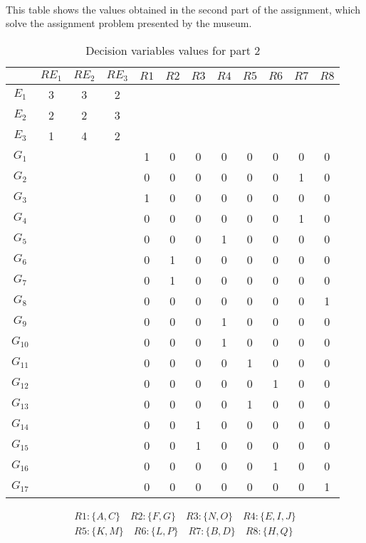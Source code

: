 \paragraph{}
This table shows the values obtained in the second part of the assignment, which solve the assignment problem presented by the museum.
\begin{table}[H]
    \setlength{\arrayrulewidth}{.1em}
    \centering
    \caption{Decision variables values for part 2}
    \begin{tabular}{cccc|cccccccc}
        \rowcolor{gray!60}
        \hline
        & $RE_1$ & $RE_2$ & $RE_3$ & $R1$ & $R2$ & $R3$ & $R4$ & $R5$ & $R6$ & $R7$ & $R8$\\
        \hline
        $E_1$ & 3 & 3 & 2\\
        $E_2$ & 2 & 2 & 3\\
        $E_3$ & 1 & 4 & 2 \\
        \hline
        $G_1$ & & & & 1 & 0 & 0 & 0 & 0 & 0 & 0 & 0\\
        $G_2$ & & & & 0 & 0 & 0 & 0 & 0 & 0 & 1 & 0\\
        $G_3$ & & & & 1 & 0 & 0 & 0 & 0 & 0 & 0 & 0\\
        $G_4$ & & & & 0 & 0 & 0 & 0 & 0 & 0 & 1 & 0\\
        $G_5$ & & & & 0 & 0 & 0 & 1 & 0 & 0 & 0 & 0\\
        $G_6$ & & & & 0 & 1 & 0 & 0 & 0 & 0 & 0 & 0\\
        $G_7$ & & & & 0 & 1 & 0 & 0 & 0 & 0 & 0 & 0\\
        $G_8$ & & & & 0 & 0 & 0 & 0 & 0 & 0 & 0 & 1\\
        $G_9$ & & & & 0 & 0 & 0 & 1 & 0 & 0 & 0 & 0\\
        $G_{10}$ & & & & 0 & 0 & 0 & 1 & 0 & 0 & 0 & 0\\
        $G_{11}$ & & & & 0 & 0 & 0 & 0 & 1 & 0 & 0 & 0\\
        $G_{12}$ & & & & 0 & 0 & 0 & 0 & 0 & 1 & 0 & 0\\
        $G_{13}$ & & & & 0 & 0 & 0 & 0 & 1 & 0 & 0 & 0\\
        $G_{14}$ & & & & 0 & 0 & 1 & 0 & 0 & 0 & 0 & 0\\
        $G_{15}$ & & & & 0 & 0 & 1 & 0 & 0 & 0 & 0 & 0\\
        $G_{16}$ & & & & 0 & 0 & 0 & 0 & 0 & 1 & 0 & 0\\
        $G_{17}$ & & & & 0 & 0 & 0 & 0 & 0 & 0 & 0 & 1\\
        \hline
    \end{tabular}
    \label{table: solution part 2 - decision variables}
\end{table}
\begin{align}
    R1: \{A,C\} \quad R2: \{F,G\} \quad R3: \{N,O\} \quad R4: \{E,I,J\}\nonumber\\
    R5: \{K,M\} \quad R6: \{L,P\} \quad R7: \{B,D\} \quad R8: \{H,Q\}\nonumber\\
    \label{eq: solution part 2 - solution set}
\end{align}
    
